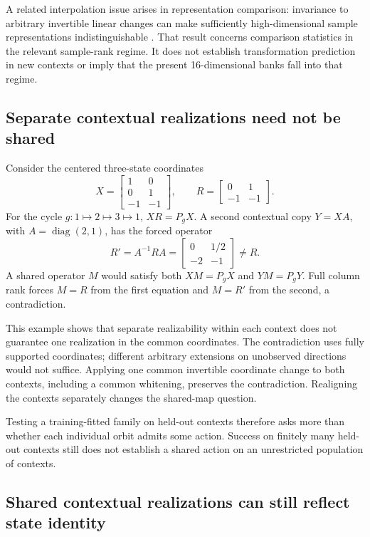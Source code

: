 A related interpolation issue arises in representation
comparison: invariance to arbitrary invertible linear
changes can make sufficiently high-dimensional sample
representations indistinguishable
\citep{kornblith2019similarity}.
That result concerns comparison statistics in the relevant
sample-rank regime.
It does not establish transformation prediction in new
contexts or imply that the present 16-dimensional banks
fall into that regime.


\subsection{Separate contextual realizations need not be shared}

Consider the centered three-state coordinates
\[
 X=
 \begin{bmatrix}
  1&0\\
  0&1\\
  -1&-1
 \end{bmatrix},
 \qquad
 R=
 \begin{bmatrix}
  0&1\\
  -1&-1
 \end{bmatrix}.
\]
For the cycle $g:1\mapsto2\mapsto3\mapsto1$,
$XR=P_gX$.
A second contextual copy $Y=XA$, with
$A=\operatorname{diag}(2,1)$, has the forced operator
\[
 R'=A^{-1}RA
 =
 \begin{bmatrix}
  0&1/2\\
  -2&-1
 \end{bmatrix}
 \ne R.
\]
A shared operator $M$ would satisfy both
$XM=P_gX$ and $YM=P_gY$.
Full column rank forces $M=R$ from the first equation and
$M=R'$ from the second, a contradiction.

This example shows that separate realizability within
each context does not guarantee one realization in the
common coordinates.
The contradiction uses fully supported coordinates;
different arbitrary extensions on unobserved directions
would not suffice.
Applying one common invertible coordinate change to both
contexts, including a common whitening, preserves the
contradiction.
Realigning the contexts separately changes the shared-map
question.

Testing a training-fitted family on held-out contexts
therefore asks more than whether each individual orbit
admits some action.
Success on finitely many held-out contexts still does not
establish a shared action on an unrestricted population of
contexts.


\subsection{Shared contextual realizations can still reflect state identity}

